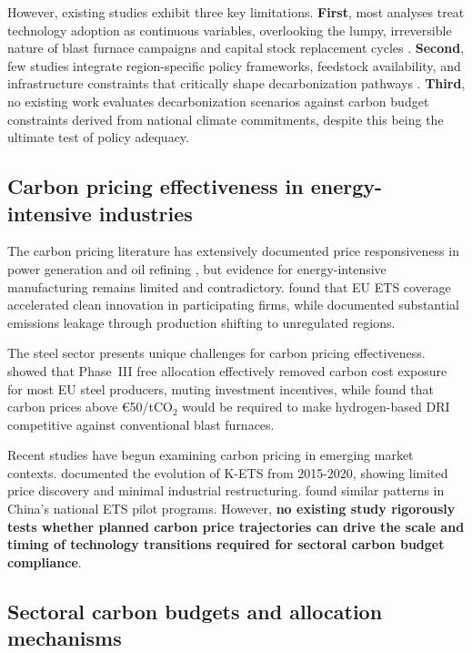 \documentclass[preprint,1p,authoryear]{elsarticle}
\begin{document}
However, existing studies exhibit three key limitations. \textbf{First}, most analyses treat technology adoption as continuous variables, overlooking the lumpy, irreversible nature of blast furnace campaigns and capital stock replacement cycles \citep{Griffin2020}. \textbf{Second}, few studies integrate region-specific policy frameworks, feedstock availability, and infrastructure constraints that critically shape decarbonization pathways \citep{zhang2022steel}. \textbf{Third}, no existing work evaluates decarbonization scenarios against carbon budget constraints derived from national climate commitments, despite this being the ultimate test of policy adequacy.

\subsection{Carbon pricing effectiveness in energy-intensive industries}

The carbon pricing literature has extensively documented price responsiveness in power generation \citep{jarke2017carbon} and oil refining \citep{fowlie2016carbon}, but evidence for energy-intensive manufacturing remains limited and contradictory. \citet{calel2016innovation} found that EU ETS coverage accelerated clean innovation in participating firms, while \citet{martin2016industry} documented substantial emissions leakage through production shifting to unregulated regions.

The steel sector presents unique challenges for carbon pricing effectiveness. \citet{sartor2012benchmark} showed that Phase~III free allocation effectively removed carbon cost exposure for most EU steel producers, muting investment incentives, while \citet{demailly2018european} found that carbon prices above €50/tCO$_2$ would be required to make hydrogen-based DRI competitive against conventional blast furnaces.

Recent studies have begun examining carbon pricing in emerging market contexts. \citet{kim2021kets} documented the evolution of K-ETS from 2015-2020, showing limited price discovery and minimal industrial restructuring. \citet{wang2021carbon} found similar patterns in China's national ETS pilot programs. However, \textbf{no existing study rigorously tests whether planned carbon price trajectories can drive the scale and timing of technology transitions required for sectoral carbon budget compliance}.

\subsection{Sectoral carbon budgets and allocation mechanisms}
\end{document}
